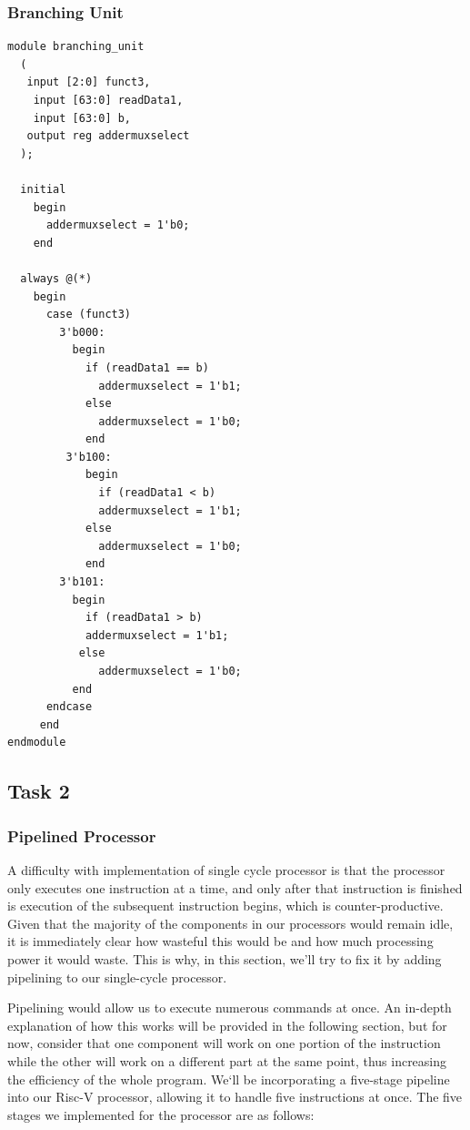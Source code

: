 \documentclass{article}
\begin{document}
\subsubsection{Branching Unit}
\begin{lstlisting}[caption={Design Module for Branching Unit}, captionpos=b, language=RISC-V]
module branching_unit
  (
   input [2:0] funct3,
    input [63:0] readData1,
    input [63:0] b,
   output reg addermuxselect
  );
  
  initial
    begin
      addermuxselect = 1'b0;
    end
  
  always @(*)
	begin
      case (funct3)
        3'b000:
          begin
            if (readData1 == b)
              addermuxselect = 1'b1;
            else
              addermuxselect = 1'b0;
            end
         3'b100:
    		begin
              if (readData1 < b)
              addermuxselect = 1'b1;
            else
              addermuxselect = 1'b0;
            end
        3'b101:
          begin
            if (readData1 > b)
          	addermuxselect = 1'b1;
           else
              addermuxselect = 1'b0;
          end    
      endcase
     end
endmodule
\end{lstlisting}
\subsection{Task 2}
\subsubsection{Pipelined Processor}
\hspace{1cm} A difficulty with implementation of single cycle processor is that the processor only executes one instruction at a time, and only after that instruction is finished is execution of the subsequent instruction begins, which is counter-productive. Given that the majority of the components in our processors would remain idle, it is immediately clear how wasteful this would be and how much processing power it would waste. This is why, in this section, we'll try to fix it by adding pipelining to our single-cycle processor.

\hspace{1cm}Pipelining would allow us to execute numerous commands at once. An in-depth explanation of how this works will be provided in the following section, but for now, consider that one component will work on one portion of the instruction while the other will work on a different part at the same point, thus increasing the efficiency of the whole program. We`ll be incorporating a five-stage pipeline into our Risc-V processor, allowing it to handle five instructions at once. The five stages we implemented for the processor are as follows:
\end{document}
